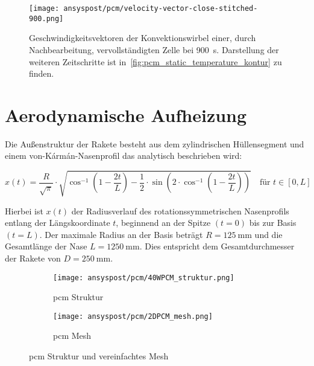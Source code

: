 \begin{figure}[H]
  \centering
  \texttt{[image: ansyspost/pcm/velocity-vector-close-stitched-900.png]}
  \caption{Geschwindigkeitsvektoren der Konvektionswirbel einer, durch Nachbearbeitung, vervollständigten Zelle
  bei \SI{900}{\second}. Darstellung der weiteren Zeitschritte ist in~\ref{fig:pcm_static_temperature_kontur} zu finden.}\label{fig:pcm_vectoren_stitched}
\end{figure}

\section{Aerodynamische Aufheizung}\label{sec:sim_aerodynamisch}

Die Außenstruktur der Rakete besteht aus dem zylindrischen Hüllensegment und einem von-Kármán-Nasenprofil das analytisch
beschrieben wird:

\begin{equation*}
  \label{eq:karman_nase}
  x(t) = \frac{R}{\sqrt{\pi}} \cdot \sqrt{
  \cos^{-1}\left(1 - \frac{2t}{L} \right)
  - \frac{1}{2} \cdot \sin\left(2 \cdot \cos^{-1}\left(1 - \frac{2t}{L} \right) \right)
  }
  \quad \text{für } t \in [0, L]
\end{equation*}

Hierbei ist $x(t)$ der Radiusverlauf des rotationssymmetrischen Nasenprofils entlang der Längskoordinate $t$, beginnend an der Spitze $(t=0)$ bis zur Basis $(t=L)$.
Der maximale Radius an der Basis beträgt $R = \SI{125}{\milli\meter}$ und die Gesamtlänge der Nase $L = \SI{1250}{\milli\meter}$.
Dies entspricht dem Gesamtdurchmesser der Rakete von $D = \SI{250}{\milli\meter}$.

\begin{figure}[H]
    \centering
    \begin{subfigure}[t]{0.7\textwidth}
        \centering
        \texttt{[image: ansyspost/pcm/40WPCM\_struktur.png]}
        \caption{\ac{pcm} Struktur}\label{fig:pcm_struktur}
    \end{subfigure}
    \hfill
    \begin{subfigure}[t]{0.15\textwidth}
        \centering
        \texttt{[image: ansyspost/pcm/2DPCM\_mesh.png]}
        \caption{\ac{pcm} Mesh}\label{fig:pcm_mesh}
    \end{subfigure}
    \caption{\ac{pcm} Struktur und vereinfachtes Mesh}\label{fig:pcm_geometrien}
\end{figure}

